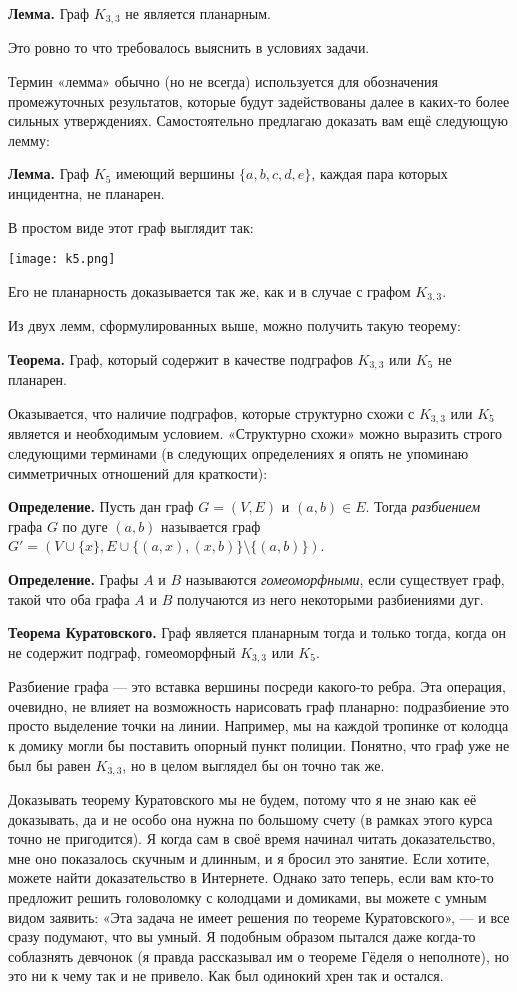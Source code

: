 {\bfseries Лемма.} Граф $K_{3, 3}$ не является планарным.

Это ровно то что требовалось выяснить в условиях задачи.

Термин «лемма» обычно (но не всегда) используется для обозначения промежуточных результатов, которые будут задействованы далее в каких-то более сильных утверждениях. Самостоятельно предлагаю доказать вам ещё следующую лемму:

{\bfseries Лемма.} Граф $K_5$ имеющий вершины $\{a, b, c, d, e\}$, каждая пара которых инцидентна, не планарен.

В простом виде этот граф выглядит так:

\texttt{[image: k5.png]}

Его не планарность доказывается так же, как и в случае с графом $K_{3, 3}$.

Из двух лемм, сформулированных выше, можно получить такую теорему:

{\bfseries Теорема.} Граф, который содержит в качестве подграфов $K_{3, 3}$ или $K_5$ не планарен.

Оказывается, что наличие подграфов, которые структурно схожи с $K_{3, 3}$ или $K_5$ является и необходимым условием. «Структурно схожи» можно выразить строго следующими терминами (в следующих определениях я опять не упоминаю симметричных отношений для краткости):

{\bfseries Определение.} Пусть дан граф $G=(V, E)$ и $(a, b) \in E$. Тогда {\slshape разбиением} графа $G$ по дуге $(a, b)$ называется граф $G' = (V\cup\{x\}, E\cup\{(a, x), (x, b)\}\setminus\{(a, b)\})$.

{\bfseries Определение.} Графы $A$ и $B$ называются {\slshape гомеоморфными}, если существует граф, такой что оба графа $A$ и $B$ получаются из него некоторыми разбиениями дуг.

{\bfseries Теорема Куратовского.} Граф является планарным тогда и только тогда, когда он не содержит подграф, гомеоморфный $K_{3, 3}$ или $K_5$.

Разбиение графа — это вставка вершины посреди какого-то ребра. Эта операция, очевидно, не влияет на возможность нарисовать граф планарно: подразбиение это просто выделение точки на линии. Например, мы на каждой тропинке от колодца к домику могли бы поставить опорный пункт полиции. Понятно, что граф уже не был бы равен $K_{3, 3}$, но в целом выглядел бы он точно так же.

Доказывать теорему Куратовского мы не будем, потому что я не знаю как её доказывать, да и не особо она нужна по большому счету (в рамках этого курса точно не пригодится). Я когда сам в своё время начинал читать доказательство, мне оно показалось скучным и длинным, и я бросил это занятие. Если хотите, можете найти доказательство в Интернете. Однако зато теперь, если вам кто-то предложит решить головоломку с колодцами и домиками, вы можете с умным видом заявить: «Эта задача не имеет решения по теореме Куратовского», — и все сразу подумают, что вы умный. Я подобным образом пытался даже когда-то соблазнять девчонок (я правда рассказывал им о теореме Гёделя о неполноте), но это ни к чему так и не привело. Как был одинокий хрен так и остался.

